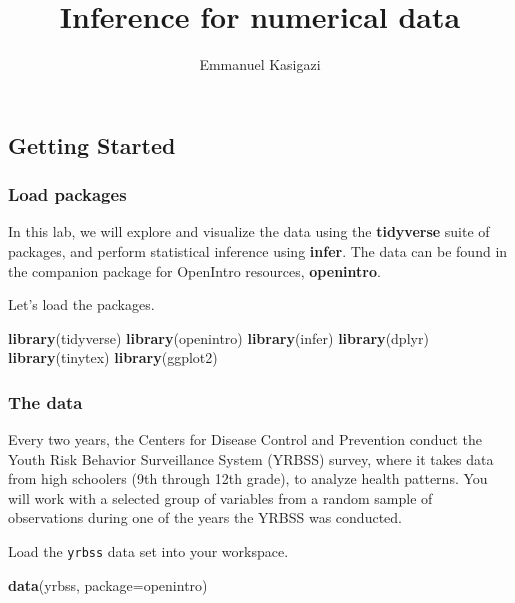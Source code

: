 \documentclass[
]{article}
\title{Inference for numerical data}
\author{Emmanuel Kasigazi}
\date{}
\newenvironment{Shaded}{\begin{snugshade}}{\end{snugshade}}
\newcommand{\AttributeTok}[1]{\textcolor[rgb]{0.13,0.29,0.53}{#1}}
\newcommand{\FunctionTok}[1]{\textcolor[rgb]{0.13,0.29,0.53}{\textbf{#1}}}
\newcommand{\NormalTok}[1]{#1}
\newcommand{\StringTok}[1]{\textcolor[rgb]{0.31,0.60,0.02}{#1}}
\begin{document}
\maketitle

\subsection{Getting Started}\label{getting-started}

\subsubsection{Load packages}\label{load-packages}

In this lab, we will explore and visualize the data using the
\textbf{tidyverse} suite of packages, and perform statistical inference
using \textbf{infer}. The data can be found in the companion package for
OpenIntro resources, \textbf{openintro}.

Let's load the packages.

\begin{Shaded}
\begin{Highlighting}[]
\FunctionTok{library}\NormalTok{(tidyverse)}
\FunctionTok{library}\NormalTok{(openintro)}
\FunctionTok{library}\NormalTok{(infer)}
\FunctionTok{library}\NormalTok{(dplyr)}
\FunctionTok{library}\NormalTok{(tinytex)}
\FunctionTok{library}\NormalTok{(ggplot2)}
\end{Highlighting}
\end{Shaded}

\subsubsection{The data}\label{the-data}

Every two years, the Centers for Disease Control and Prevention conduct
the Youth Risk Behavior Surveillance System (YRBSS) survey, where it
takes data from high schoolers (9th through 12th grade), to analyze
health patterns. You will work with a selected group of variables from a
random sample of observations during one of the years the YRBSS was
conducted.

Load the \texttt{yrbss} data set into your workspace.

\begin{Shaded}
\begin{Highlighting}[]
\FunctionTok{data}\NormalTok{(}\StringTok{\textquotesingle{}yrbss\textquotesingle{}}\NormalTok{, }\AttributeTok{package=}\StringTok{\textquotesingle{}openintro\textquotesingle{}}\NormalTok{)}
\end{Highlighting}
\end{Shaded}
\end{document}
